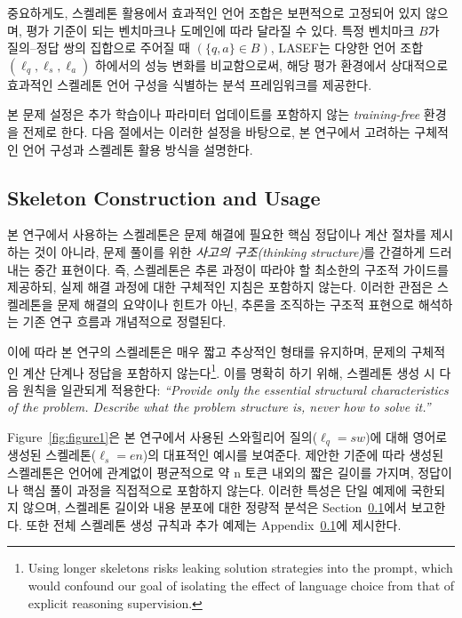 중요하게도, 스켈레톤 활용에서 효과적인 언어 조합은 보편적으로 고정되어 있지 않으며, 평가 기준이 되는 벤치마크나 도메인에 따라 달라질 수 있다. 특정 벤치마크 $B$가 질의–정답 쌍의 집합으로 주어질 때 $(\{q,a\} \in B)$, LASEF는 다양한 언어 조합 $(\ell_q, \ell_s, \ell_a)$ 하에서의 성능 변화를 비교함으로써, 해당 평가 환경에서 상대적으로 효과적인 스켈레톤 언어 구성을 식별하는 분석 프레임워크를 제공한다.

본 문제 설정은 추가 학습이나 파라미터 업데이트를 포함하지 않는 \emph{training-free} 환경을 전제로 한다. 다음 절에서는 이러한 설정을 바탕으로, 본 연구에서 고려하는 구체적인 언어 구성과 스켈레톤 활용 방식을 설명한다.

\subsection{Skeleton Construction and Usage}

본 연구에서 사용하는 스켈레톤은 문제 해결에 필요한 핵심 정답이나 계산 절차를 제시하는 것이 아니라, 문제 풀이를 위한 \emph{사고의 구조(thinking structure)}를 간결하게 드러내는 중간 표현이다. 즉, 스켈레톤은 추론 과정이 따라야 할 최소한의 구조적 가이드를 제공하되, 실제 해결 과정에 대한 구체적인 지침은 포함하지 않는다. 이러한 관점은 스켈레톤을 문제 해결의 요약이나 힌트가 아닌, 추론을 조직하는 구조적 표현으로 해석하는 기존 연구 흐름과 개념적으로 정렬된다.

이에 따라 본 연구의 스켈레톤은 매우 짧고 추상적인 형태를 유지하며, 문제의 구체적인 계산 단계나 정답을 포함하지 않는다\footnote{Using longer skeletons risks leaking solution strategies into the prompt, which would confound our goal of isolating the effect of language choice from that of explicit reasoning supervision.}. 이를 명확히 하기 위해, 스켈레톤 생성 시 다음 원칙을 일관되게 적용한다: \emph{``Provide only the essential structural characteristics of the problem. Describe what the problem structure is, never how to solve it.''}

Figure~\ref{fig:figure1}은 본 연구에서 사용된 스와힐리어 질의($\ell_q=sw$)에 대해 영어로 생성된 스켈레톤($\ell_s=en$)의 대표적인 예시를 보여준다. 제안한 기준에 따라 생성된 스켈레톤은 언어에 관계없이 평균적으로 약 n 토큰 내외의 짧은 길이를 가지며, 정답이나 핵심 풀이 과정을 직접적으로 포함하지 않는다. 이러한 특성은 단일 예제에 국한되지 않으며, 스켈레톤 길이와 내용 분포에 대한 정량적 분석은 Section~\ref{}에서 보고한다. 또한 전체 스켈레톤 생성 규칙과 추가 예제는 Appendix~\ref{}에 제시한다.

